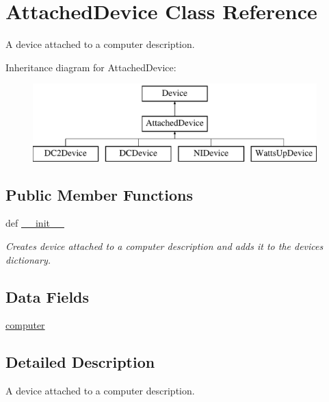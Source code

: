 \hypertarget{classsettings__classes_1_1_attached_device}{\section{\-Attached\-Device \-Class \-Reference}
\label{classsettings__classes_1_1_attached_device}
}


\-A device attached to a computer description.  


\-Inheritance diagram for \-Attached\-Device\-:\begin{figure}[H]
\begin{center}
\leavevmode
\includegraphics[height=3.000000cm]{classsettings__classes_1_1_attached_device}
\end{center}
\end{figure}
\subsection*{\-Public \-Member \-Functions}
\begin{DoxyCompactItemize}
\item 
def \hyperlink{classsettings__classes_1_1_attached_device_ac775ee34451fdfa742b318538164070e}{\-\_\-\-\_\-init\-\_\-\-\_\-}
\begin{DoxyCompactList}\small\item\em \-Creates device attached to a computer description and adds it to the devices dictionary. \end{DoxyCompactList}\end{DoxyCompactItemize}
\subsection*{\-Data \-Fields}
\begin{DoxyCompactItemize}
\item 
\hyperlink{classsettings__classes_1_1_attached_device_a98f8cb986fbbcd435b452dc91dc6e8c1}{computer}
\end{DoxyCompactItemize}


\subsection{\-Detailed \-Description}
\-A device attached to a computer description. 

